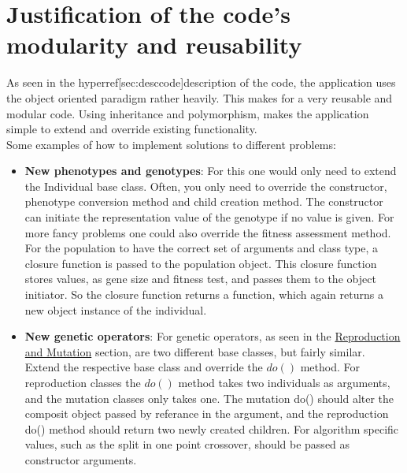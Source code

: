 \section{Justification of the code's modularity and reusability}

As seen in the hyperref[sec:desccode]{description of the code}, the application uses the object oriented paradigm
rather heavily. This makes for a very reusable and modular code. Using inheritance and polymorphism, makes the
application simple to extend and override existing functionality. \\

Some examples of how to implement solutions to different problems:
\begin{itemize}

\item \textbf{New phenotypes and genotypes}: For this one would only need to extend the Individual base class. Often, you only need to override the constructor, phenotype conversion method and child creation method. The constructor can initiate the representation value of the genotype if no value is given. For more fancy problems one could also override the fitness assessment method. For the population to have the correct set of arguments and class type, a closure function is passed to the population object. This closure function stores values, as gene size and fitness test, and passes them to the object initiator. So the closure function returns a function, which again returns a new object instance of the individual.

\item \textbf{New genetic operators}: For genetic operators, as seen in the \hyperref[sec:repmut]{Reproduction and Mutation} section, are two different base classes, but fairly similar. Extend the respective base class and override the $do()$ method. For reproduction classes the $do()$ method takes two individuals as arguments, and the mutation classes only takes one. The mutation do() should alter the composit object passed by referance in the argument, and the reproduction do() method should return two newly created children. For algorithm specific values, such as the split in one point crossover, should be passed as constructor arguments. 


\end{itemize}
